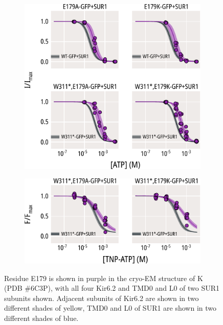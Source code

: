 \begin{figure}[hbtp]
\begin{subfigure}[t]{0.45\textwidth}
	\end{subfigure}
	\vfill
	\begin{subfigure}[t]{0.45\textwidth}
		\caption{}\label{ch5fig:e179_atp_popfits}
		\centering
		\includegraphics[width=\textwidth]{e179_2.pdf}
	\end{subfigure}
	\hfill
	\begin{subfigure}[t]{0.45\textwidth}
		\caption{}\label{ch5fig:e179_tnpatp_popfits_2}
		\centering
		\includegraphics[width=\textwidth]{e179_4.pdf}
	\end{subfigure}
	\caption[Functional effects of E179 mutations]{
	 Residue E179 is shown in purple in the cryo-EM structure of K\ATP{} (PDB \#6C3P), with all four Kir6.2 and TMD0 and L0 of two SUR1 subunits shown.
	Adjacent subunits of Kir6.2 are shown in two different shades of yellow, TMD0 and L0 of SUR1 are shown in two different shades of blue.
}
\end{figure}

